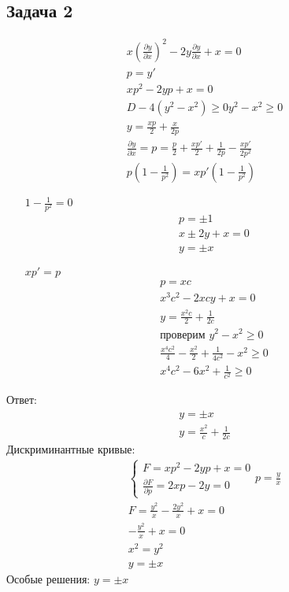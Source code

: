 \subsection*{Задача 2}
	\begin{gather*}
		x \left(\frac{\partial y}{\partial x}\right)^2 - 2y \frac{\partial y}{\partial x} + x = 0\\
		p = y'\\
		xp^2 - 2yp + x = 0\\
		D - 4\left(y^2 - x^2\right) \geqslant 0
		y^2 - x^2 \geqslant 0\\
		y = \frac{xp}{2} + \frac{x}{2p}\\
		\frac{\partial y}{\partial x} = p = \frac{p}{2} + \frac{xp'}{2} + \frac{1}{2p} - \frac{xp'}{2p^2}\\
		p\left(1 - \frac{1}{p^2}\right) = xp'\left(1 - \frac{1}{p^2}\right)
	\end{gather*}
	\begin{enumerate}
	\item[$1 - \frac{1}{p^2} = 0$]
		\begin{gather*}
			p = \pm 1\\
			x \pm 2y + x = 0\\
			y = \pm x
		\end{gather*}
	\item[$xp'= p$]
		\begin{gather*}
			p = xc\\
			x^3 c^2 - 2xcy + x = 0\\
			y = \frac{x^2 c}{2} + \frac{1}{2c}\\
			\text{проверим } y^2 - x^2 \geqslant 0\\
			\frac{x^4 c^2}{4} - \frac{x^2}{2} + \frac{1}{4c^2} - x^2 \geqslant 0\\
			x^4 c^2 - 6x^2 + \frac{1}{c^2} \geqslant 0
		\end{gather*}
	\end{enumerate}
	Ответ:
	\begin{gather*}
		y = \pm x\\
		y = \frac{x^2}{c} + \frac{1}{2c}
	\end{gather*}
	Дискриминантные кривые:
	\begin{gather*}
	\begin{cases}
		F = xp^2 - 2yp + x = 0\\
		\frac{\partial F}{\partial p} = 2xp - 2y = 0
	\end{cases}
	p = \frac{y}{x}\\
	F = \frac{y^2}{x} - \frac{2y^2}{x} + x = 0\\
	-\frac{y^2}{x} + x = 0\\
	x^2 = y^2\\
	y = \pm x
	\end{gather*}
	Особые решения: $y = \pm x$
	
